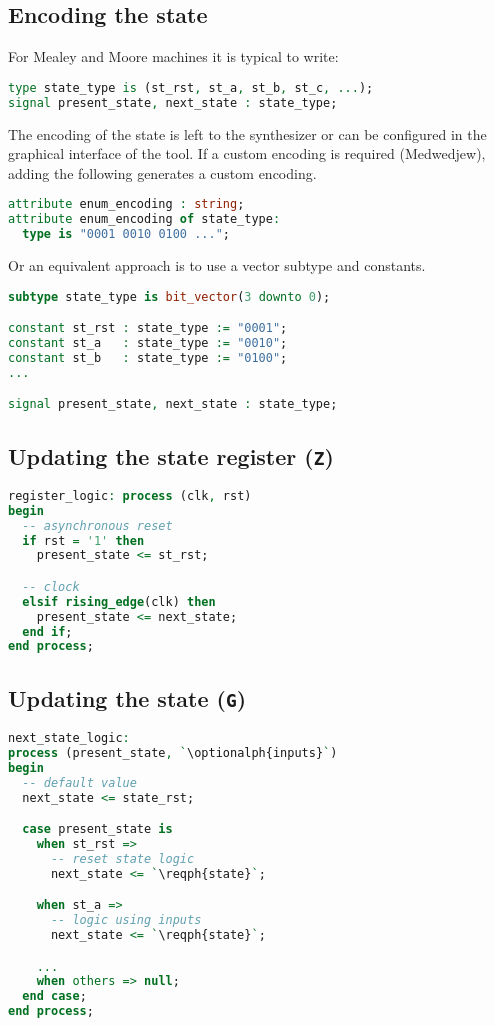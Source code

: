 \subsection{Encoding the state}
For Mealey and Moore machines it is typical to write:
\begin{lstlisting}[language=vhdl]
type state_type is (st_rst, st_a, st_b, st_c, ...);
signal present_state, next_state : state_type;
\end{lstlisting}
The encoding of the state is left to the synthesizer or can be configured in
the graphical interface of the tool.  If a custom encoding is required
(Medwedjew), adding the following generates a custom encoding.
\begin{lstlisting}[language=vhdl]
attribute enum_encoding : string;
attribute enum_encoding of state_type:
  type is "0001 0010 0100 ...";
\end{lstlisting}
Or an equivalent approach is to use a vector subtype and constants.
\begin{lstlisting}[language=vhdl]
subtype state_type is bit_vector(3 downto 0);

constant st_rst : state_type := "0001";
constant st_a   : state_type := "0010";
constant st_b   : state_type := "0100";
...

signal present_state, next_state : state_type;
\end{lstlisting}

\subsection{Updating the state register (\texttt{Z})}
\begin{lstlisting}[language=vhdl]
register_logic: process (clk, rst)
begin
  -- asynchronous reset
  if rst = '1' then
    present_state <= st_rst;

  -- clock
  elsif rising_edge(clk) then
    present_state <= next_state;
  end if;
end process;
\end{lstlisting}

\subsection{Updating the state (\texttt{G})}
\begin{lstlisting}[language=vhdl]
next_state_logic:
process (present_state, `\optionalph{inputs}`)
begin
  -- default value
  next_state <= state_rst;

  case present_state is
    when st_rst =>
      -- reset state logic
      next_state <= `\reqph{state}`;

    when st_a =>
      -- logic using inputs
      next_state <= `\reqph{state}`;

    ...
    when others => null;
  end case;
end process;
\end{lstlisting}


